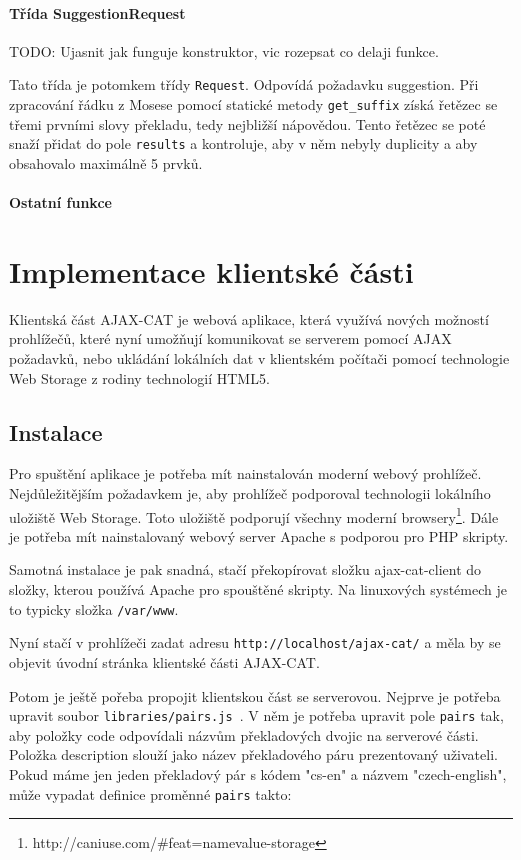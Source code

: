 \documentclass[12pt,a4paper]{report}
\begin{document}
\subsubsection{Třída SuggestionRequest}
TODO: Ujasnit jak funguje konstruktor, vic rozepsat co delaji funkce.

Tato třída je potomkem třídy {\tt Request}. Odpovídá požadavku suggestion. Při zpracování řádku z Mosese pomocí statické metody {\tt get\_suffix} získá řetězec se třemi prvními slovy překladu, tedy nejbližší nápovědou. Tento řetězec se poté snaží přidat do pole {\tt results} a kontroluje, aby v něm nebyly duplicity a aby obsahovalo maximálně 5 prvků.

\subsubsection{Ostatní funkce}

\chapter{Implementace klientské části}

Klientská část AJAX-CAT je webová aplikace, která využívá nových možností prohlížečů, které nyní umožňují komunikovat se serverem pomocí AJAX požadavků, nebo ukládání lokálních dat v klientském počítači pomocí technologie Web Storage z rodiny technologií HTML5. 

\section{Instalace}
Pro spuštění aplikace je potřeba mít nainstalován moderní webový prohlížeč. Nejdůležitějším požadavkem je, aby prohlížeč podporoval technologii lokálního uložiště Web Storage. Toto uložiště podporují všechny moderní browsery\footnote{http://caniuse.com/\#feat=namevalue-storage}. Dále je potřeba mít nainstalovaný webový server Apache s podporou pro PHP skripty.

Samotná instalace je pak snadná, stačí překopírovat složku ajax-cat-client do složky, kterou používá Apache pro spouštěné skripty. Na linuxových systémech je to typicky složka {\tt /var/www}.

Nyní stačí v prohlížeči zadat adresu {\tt http://localhost/ajax-cat/} a měla by se objevit úvodní stránka klientské části AJAX-CAT.

Potom je ještě pořeba propojit klientskou část se serverovou. Nejprve je potřeba upravit soubor {\tt libraries/pairs.js }. V něm je potřeba upravit pole {\tt pairs} tak, aby položky code odpovídali názvům překladových dvojic na serverové části. Položka description slouží jako název překladového páru prezentovaný uživateli. Pokud máme jen jeden překladový pár s kódem "cs-en" a názvem "czech-english", může vypadat definice proměnné {\tt pairs} takto: \\
\end{document}
